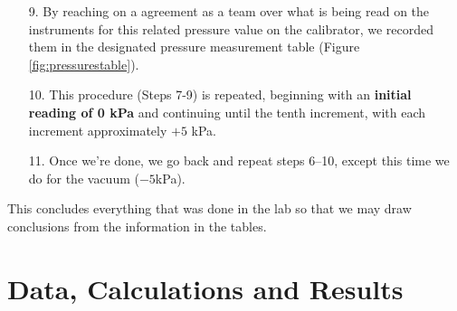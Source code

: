 \documentclass{article}
\begin{document}
	\begin{minipage}{0.51\textwidth}\vspace{-2em}\raggedright
		\begin{enumerate}[left=0in]
			\item[9.]  By reaching on a agreement as a team over what is being read on the instruments for this related pressure value on the calibrator, we recorded them in the designated pressure measurement table (Figure \ref{fig:pressurestable}). 
			\item[10.] This procedure (Steps 7-9) is repeated, beginning with an \textbf{initial reading of 0 kPa} and continuing until the tenth increment, with each increment approximately $+5$ kPa.
			\item[11.] Once we're done, we go back and repeat steps 6–10, except this time we do for the vacuum ($-5$kPa).
		\end{enumerate}\noindent
		This concludes everything that was done in the lab so that we may draw conclusions from the information in the tables.
	\end{minipage}
	

	\newpage\restoregeometry
	\section{Data, Calculations and Results}
	
	\tikzexternaldisable
\end{document}
